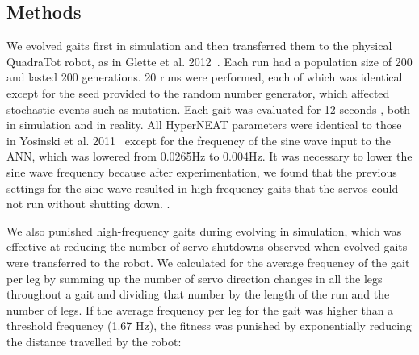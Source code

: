 
\subsection{Methods}

We evolved gaits first in simulation and then transferred them to the physical QuadraTot robot, as in Glette et al. 2012~\cite{glette}. 
Each run had a population size of 200 and lasted 200 generations. 20 runs were performed, each of which was identical except for the seed provided to the random number generator, which affected stochastic events such as mutation. 
Each gait was evaluated for 12 seconds , both in simulation and in reality. 
All HyperNEAT parameters were identical to those in Yosinski et al. 2011~\cite{yos:clune} except for the frequency of the sine wave input to the ANN, which was lowered from 0.0265Hz to 0.004Hz. It was necessary to lower the sine wave frequency because after experimentation, we found that the previous settings for the sine wave resulted in high-frequency gaits that the servos could not run without shutting down. . 


%
%

We also punished high-frequency gaits during evolving in simulation, which was effective at reducing the number of servo shutdowns observed when evolved gaits were transferred to the robot. We calculated for the average frequency of the gait per leg by summing up the number of servo direction changes in all the legs throughout a gait and dividing that number by the length of the run and the number of legs. If the average frequency per leg  for the gait was higher than a threshold frequency (1.67 Hz), the fitness was punished by exponentially reducing the distance travelled by the robot:

